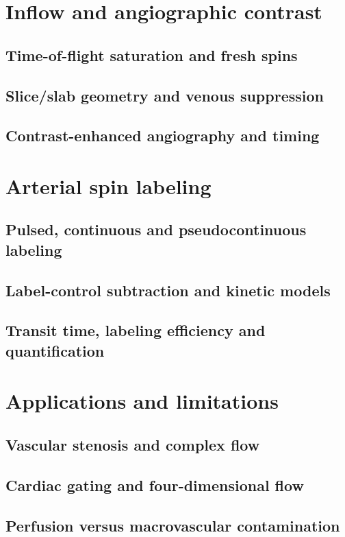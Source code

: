 \section{Inflow and angiographic contrast}
\label{sec:19:inflow-and-angiographic-contrast}
\subsection{Time-of-flight saturation and fresh spins}
\subsection{Slice/slab geometry and venous suppression}
\subsection{Contrast-enhanced angiography and timing}

\section{Arterial spin labeling}
\label{sec:19:arterial-spin-labeling}
\subsection{Pulsed, continuous and pseudocontinuous labeling}
\subsection{Label-control subtraction and kinetic models}
\subsection{Transit time, labeling efficiency and quantification}

\section{Applications and limitations}
\label{sec:19:applications-and-limitations}
\subsection{Vascular stenosis and complex flow}
\subsection{Cardiac gating and four-dimensional flow}
\subsection{Perfusion versus macrovascular contamination}


